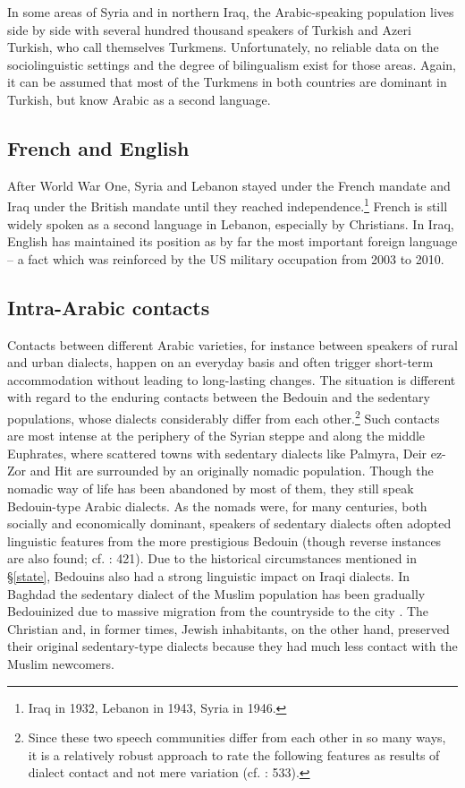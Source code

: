 \documentclass[output=paper]{langsci/langscibook}
\begin{document}
In some areas of Syria and in northern Iraq, the Arabic-speaking population lives side by side with several hundred thousand speakers of Turkish and Azeri Turkish, who call themselves Turkmens. Unfortunately, no reliable data on the sociolinguistic settings and the degree of bilingualism exist for those areas. Again, it can be assumed that most of the Turkmens in both countries are dominant in Turkish, but know Arabic as a second language.

 \subsection{French and English} \label{french}

After World War One, Syria and Lebanon stayed under the French mandate and Iraq under the British mandate until they reached independence.\footnote{Iraq in 1932, Lebanon in 1943, Syria in 1946.} French is still widely spoken as a second language in Lebanon, especially by Christians. In Iraq, English has maintained its position as by far the most important foreign language – a fact which was reinforced by the US military occupation from 2003 to 2010. 

  \subsection{Intra-Arabic contacts} 

Contacts between different Arabic varieties, for instance between speakers of rural and urban dialects, happen on an everyday basis and often trigger short-term accommodation without leading to long-lasting changes. The situation is different with regard to the enduring contacts between the Bedouin and the sedentary populations, whose dialects considerably differ from each other.\footnote{Since these two speech communities differ from each other in so many ways, it is a relatively robust approach to rate the following features as results of dialect contact and not mere variation (cf. \citealt{Lucas2015}: 533).} Such contacts are most intense at the periphery of the Syrian steppe and along the middle Euphrates, where scattered towns with sedentary dialects like Palmyra, Deir ez-Zor and Hit are surrounded by an originally nomadic population. Though the nomadic way of life has been abandoned by most of them, they still speak Bedouin-type Arabic dialects. As the nomads were, for many centuries, both socially and economically dominant, speakers of sedentary dialects often adopted linguistic features from the more prestigious Bedouin (though reverse instances are also found; cf. \citealt{Behnstedt1994Dialektkontakt}: 421). Due to the historical circumstances mentioned in §\ref{state}, Bedouins also had a strong linguistic impact on Iraqi dialects. In Baghdad the sedentary dialect of the Muslim population has been gradually Bedouinized due to massive migration from the countryside to the city \citep{Palva2009}. The Christian and, in former times, Jewish inhabitants, on the other hand, preserved their original sedentary-type dialects because they had much less contact with the Muslim newcomers. 
\end{document}
